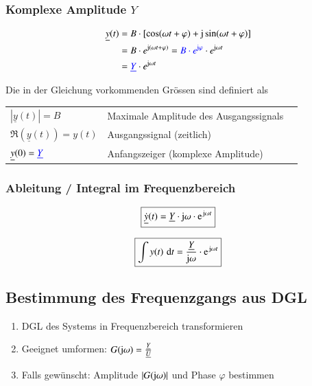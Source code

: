 \subsubsection{Komplexe Amplitude $Y$}

\vspace{-0.5cm} %
\begin{align*}
    \underline{y}(t) &= B \cdot [\cos(\omega t + \varphi) + \mathrm{j} \sin(\omega t + \varphi)] \\
                &= B \cdot e^{\mathrm{j}(\omega t + \varphi)} = {\color{blue}B \cdot e^{\mathrm{j} \varphi}} \cdot e^{\mathrm{j} \omega t} \\
                &= {\color{blue}\underline{Y}} \cdot e^{\mathrm{j} \omega t}
\end{align*}

Die in der Gleichung vorkommenden Grössen sind definiert als \\
\begin{tabular}{lll}
    $ | \underline{y}(t) | = B$                 & Maximale Amplitude des Ausgangssignals \\
    $ \Re{(\underline{y}(t))} = y(t)$           & Ausgangssignal (zeitlich) \\
    $ \underline{y}(0) = {\color{blue}\underline{Y}} $  & Anfangszeiger (komplexe Amplitude)
\end{tabular}


\subsubsection{Ableitung / Integral im Frequenzbereich}

\begin{minipage}[c]{0.48\columnwidth}
    $$ \boxed{ \underline{\dot{y}}(t) = \underline{Y} \cdot \jimg \omega \cdot \e^{\jimg \omega t} } $$
\end{minipage}
\hfill
\begin{minipage}[c]{0.48\columnwidth}
    $$\boxed{ \int y(t) \, \diff t = \frac{\underline{Y}}{\jimg \omega} \cdot \e^{\jimg \omega t} } $$
\end{minipage}


\subsection{Bestimmung des Frequenzgangs aus DGL}

\begin{enumerate}
    \item DGL des Systems in Frequenzbereich transformieren
    \item Geeignet umformen: $G(\mathrm{j} \omega) = \frac{\underline{Y}}{\underline{U}}$
    \item Falls gewünscht: Amplitude $|G(\mathrm{j} \omega)|$ und Phase $\varphi$ bestimmen
\end{enumerate}


